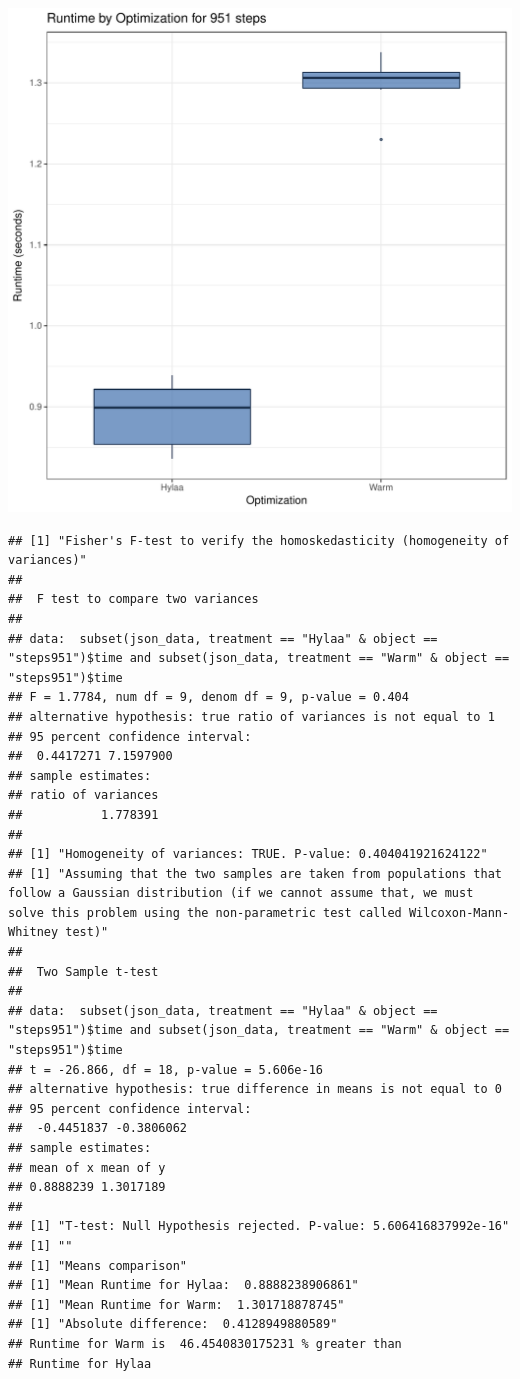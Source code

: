\documentclass{article}\usepackage[]{graphicx}\usepackage[]{color}
\makeatletter
\def\maxwidth{ %
  \ifdim\Gin@nat@width>\linewidth
    \linewidth
  \else
    \Gin@nat@width
  \fi
}
\newenvironment{kframe}{%
 \def\at@end@of@kframe{}%
 \ifinner\ifhmode%
  \def\at@end@of@kframe{\end{minipage}}%
  \begin{minipage}{\columnwidth}%
 \fi\fi%
 \def\FrameCommand##1{\hskip\@totalleftmargin \hskip-\fboxsep
 \colorbox{shadecolor}{##1}\hskip-\fboxsep
     \hskip-\linewidth \hskip-\@totalleftmargin \hskip\columnwidth}%
 \MakeFramed {\advance\hsize-\width
   \@totalleftmargin\z@ \linewidth\hsize
   \@setminipage}}%
 {\par\unskip\endMakeFramed%
 \at@end@of@kframe}
\newenvironment{knitrout}{}{} %
\makeatother
\begin{document}
\begin{knitrout}
\color{fgcolor}
\includegraphics[width=\maxwidth]{figure/RH1_steps951-1} 
\begin{kframe}\begin{verbatim}
## [1] "Fisher's F-test to verify the homoskedasticity (homogeneity of variances)"
## 
## 	F test to compare two variances
## 
## data:  subset(json_data, treatment == "Hylaa" & object == "steps951")$time and subset(json_data, treatment == "Warm" & object == "steps951")$time
## F = 1.7784, num df = 9, denom df = 9, p-value = 0.404
## alternative hypothesis: true ratio of variances is not equal to 1
## 95 percent confidence interval:
##  0.4417271 7.1597900
## sample estimates:
## ratio of variances 
##           1.778391 
## 
## [1] "Homogeneity of variances: TRUE. P-value: 0.404041921624122"
## [1] "Assuming that the two samples are taken from populations that follow a Gaussian distribution (if we cannot assume that, we must solve this problem using the non-parametric test called Wilcoxon-Mann-Whitney test)"
## 
## 	Two Sample t-test
## 
## data:  subset(json_data, treatment == "Hylaa" & object == "steps951")$time and subset(json_data, treatment == "Warm" & object == "steps951")$time
## t = -26.866, df = 18, p-value = 5.606e-16
## alternative hypothesis: true difference in means is not equal to 0
## 95 percent confidence interval:
##  -0.4451837 -0.3806062
## sample estimates:
## mean of x mean of y 
## 0.8888239 1.3017189 
## 
## [1] "T-test: Null Hypothesis rejected. P-value: 5.606416837992e-16"
## [1] ""
## [1] "Means comparison"
## [1] "Mean Runtime for Hylaa:  0.8888238906861"
## [1] "Mean Runtime for Warm:  1.301718878745"
## [1] "Absolute difference:  0.4128949880589"
## Runtime for Warm is  46.4540830175231 % greater than 
## Runtime for Hylaa
\end{verbatim}
\end{kframe}
\end{knitrout}
\end{document}
